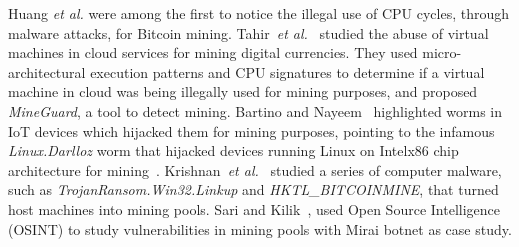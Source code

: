 \documentclass[acmlarge]{acmart}
\newcommand{\etal}{{\em et al.}\xspace}
\begin{document}
Huang \etal \cite{HuangDMDGMSWSL14}  were among the first to notice the illegal use of CPU cycles, through malware attacks, for Bitcoin mining. Tahir~\etal~\cite{TahirHDAGZCB17} studied the abuse of virtual machines in cloud services for mining digital currencies. They used micro-architectural execution patterns and CPU signatures to determine if a virtual machine in cloud was being illegally used for mining purposes, and proposed \textit{MineGuard}, a tool to detect mining. Bartino and Nayeem~\cite{BertinoN-17} highlighted worms in IoT devices which hijacked them for mining purposes, pointing to the infamous {\em Linux.Darlloz} worm that hijacked devices running Linux on Intelx86 chip architecture for mining~\cite{Bansal-14}. Krishnan~\etal~\cite{KrishnanSV-17} studied a series of computer malware, such as {\em TrojanRansom.Win32.Linkup} and {\em HKTL\_BITCOINMINE}, that turned host machines into mining pools. Sari and Kilik~\cite{SariS-17}, used Open Source Intelligence (OSINT) to study vulnerabilities in mining pools with Mirai botnet as case study. 
\end{document}
